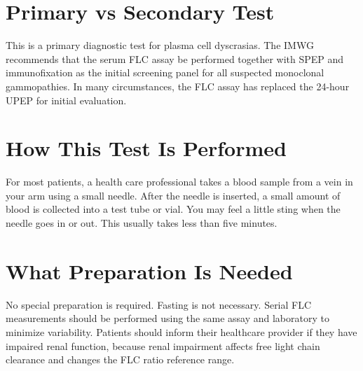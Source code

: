 \section*{Primary vs Secondary Test}
This is a primary diagnostic test for plasma cell dyscrasias. The IMWG recommends that the serum FLC assay be performed together with SPEP and immunofixation as the initial screening panel for all suspected monoclonal gammopathies. In many circumstances, the FLC assay has replaced the 24-hour UPEP for initial evaluation.

\section*{How This Test Is Performed}
For most patients, a health care professional takes a blood sample from a vein in your arm using a small needle. After the needle is inserted, a small amount of blood is collected into a test tube or vial. You may feel a little sting when the needle goes in or out. This usually takes less than five minutes.

\section*{What Preparation Is Needed}
No special preparation is required. Fasting is not necessary. Serial FLC measurements should be performed using the same assay and laboratory to minimize variability. Patients should inform their healthcare provider if they have impaired renal function, because renal impairment affects free light chain clearance and changes the FLC ratio reference range.

